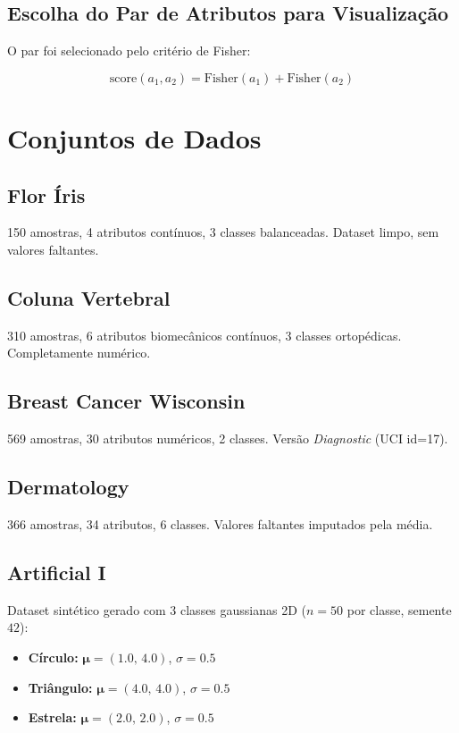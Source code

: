 \documentclass[12pt, a4paper]{article}
\begin{document}
\subsection{Escolha do Par de Atributos para Visualização}

O par foi selecionado pelo critério de Fisher:

\begin{equation}
    \text{score}(a_1,a_2) =
    \text{Fisher}(a_1)+\text{Fisher}(a_2)
\end{equation}

\section{Conjuntos de Dados}

\subsection{Flor Íris}
150 amostras, 4 atributos contínuos, 3 classes balanceadas.
Dataset limpo, sem valores faltantes.

\subsection{Coluna Vertebral}
310 amostras, 6 atributos biomecânicos contínuos, 3 classes
ortopédicas. Completamente numérico.

\subsection{Breast Cancer Wisconsin}
569 amostras, 30 atributos numéricos, 2 classes. Versão
\textit{Diagnostic} (UCI id=17).

\subsection{Dermatology}
366 amostras, 34 atributos, 6 classes. Valores faltantes imputados
pela média.

\subsection{Artificial I}
Dataset sintético gerado com 3 classes gaussianas 2D
($n=50$ por classe, semente $42$):
\begin{itemize}
    \item \textbf{Círculo:} $\boldsymbol{\mu}=(1.0,\,4.0)$, $\sigma=0.5$
    \item \textbf{Triângulo:} $\boldsymbol{\mu}=(4.0,\,4.0)$, $\sigma=0.5$
    \item \textbf{Estrela:} $\boldsymbol{\mu}=(2.0,\,2.0)$, $\sigma=0.5$
\end{itemize}
\end{document}
